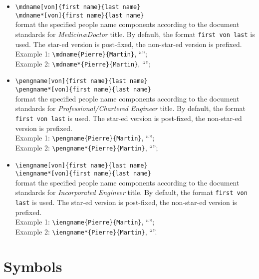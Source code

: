 \documentclass[book]{upmethodology-document}
\begin{document}
\begin{itemize}
\item \texttt{{\textbackslash}mdname[von]\{first name\}\{last name\}} \\
      \texttt{{\textbackslash}mdname*[von]\{first name\}\{last name\}} \\
	format the specified people name components according to the document standards for \emph{Medicin\ae Doctor} title. By default, the format \texttt{first von last} is used. The star-ed version is post-fixed, the non-star-ed version is prefixed. \\
	Example 1: \texttt{{\textbackslash}mdname\{Pierre\}\{Martin\}}, ``''; \\
	Example 2: \texttt{{\textbackslash}mdname*\{Pierre\}\{Martin\}}, ``'';
\item \texttt{{\textbackslash}pengname[von]\{first name\}\{last name\}} \\
      \texttt{{\textbackslash}pengname*[von]\{first name\}\{last name\}} \\
	format the specified people name components according to the document standards for \emph{Professional/Chartered Engineer} title. By default, the format \texttt{first von last} is used. The star-ed version is post-fixed, the non-star-ed version is prefixed. \\
	Example 1: \texttt{{\textbackslash}pengname\{Pierre\}\{Martin\}}, ``''; \\
	Example 2: \texttt{{\textbackslash}pengname*\{Pierre\}\{Martin\}}, ``'';
\item \texttt{{\textbackslash}iengname[von]\{first name\}\{last name\}} \\
      \texttt{{\textbackslash}iengname*[von]\{first name\}\{last name\}} \\
	format the specified people name components according to the document standards for \emph{Incorporated Engineer} title. By default, the format \texttt{first von last} is used. The star-ed version is post-fixed, the non-star-ed version is prefixed. \\
	Example 1: \texttt{{\textbackslash}iengname\{Pierre\}\{Martin\}}, ``''; \\
	Example 2: \texttt{{\textbackslash}iengname*\{Pierre\}\{Martin\}}, ``''.
\end{itemize}


\section{Symbols}
\end{document}
